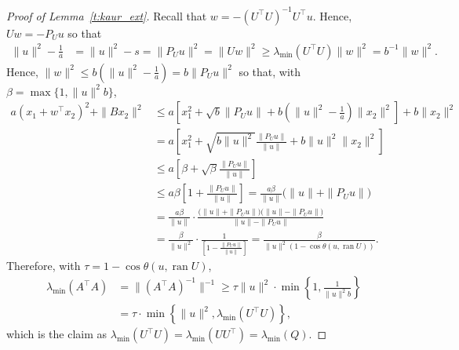 \documentclass[a4paper, reqno]{amsart}
\begin{document}
\begin{proof}[Proof of Lemma~\ref{t:kaur_ext}]
Recall that $w = -(U^\top U)^{-1}U^\top u$. Hence, $Uw = -P_{U}u$ so that
\begin{align*}
\|u\|^2 - \tfrac 1{a} &= \|u\|^2 - s
= \|P_{U}u\|^2 = \|Uw\|^2 \ge\lambda_{\min}(U^\top U)\|w\|^2 = b^{-1}\|w\|^2.
\end{align*}
Hence, $\|w\|^2\le b(\|u\|^2-\frac 1a) = b\|P_Uu\|^2$ so that, with $\beta = \max\{1,\|u\|^2b\}$,
\begin{align*}
    a(x_1 + w^\top x_2)^2 + \|Bx_2\|^2
    &\le a\left[x_1^2 + \sqrt{b}\|P_Uu\| + b(\|u\|^2-\tfrac 1{a})\|x_2\|^2\right] + b\|x_2\|^2\\
    &= a\left[x_1^2 + \sqrt{b\|u\|^2}\frac{\|P_Uu\|}{\|u\|} + b\|u\|^2\|x_2\|^2\right] \\
    &\le a\left[\beta + \sqrt{\beta}\frac{\|P_Uu\|}{\|u\|}\right]\\
&\le a\beta\left[1 + \frac{\|P_Uu\|}{\|u\|}\right] = \frac{a\beta}{\|u\|}\big(\|u\| + \|P_Uu\|\big)\\
&= \frac{a\beta}{\|u\|}\cdot\frac{\big(\|u\| + \|P_Uu\|\big)\big(\|u\| - \|P_Uu\|\big)}{\|u\| - \|P_Uu\|}\\
&= \frac{\beta}{\|u\|^2}\cdot\frac{1}{\left[1 - \frac{\|P_Uu\|}{\|u\|}\right]} = \frac{\beta}{\|u\|^2(1 - \cos\theta(u,\operatorname{ran}U))}.
\end{align*}
Therefore, with $\tau = 1 - \cos\theta(u,\operatorname{ran} U)$,
\begin{align*}
    \lambda_{\min}(A^\top A) &= \|(A^\top A)^{-1}\|^{-1} \ge \tau\|u\|^2\cdot\min\left\{1,\frac{1}{\|u\|^2b}\right\} \\
    &= \tau\cdot\min\left\{\|u\|^2,\lambda_{\min}(U^\top U)\right\},
\end{align*}
which is the claim as $\lambda_{\min}(U^\top U) = \lambda_{\min}(UU^\top) = \lambda_{\min}(Q)$.
\end{proof}
\end{document}
